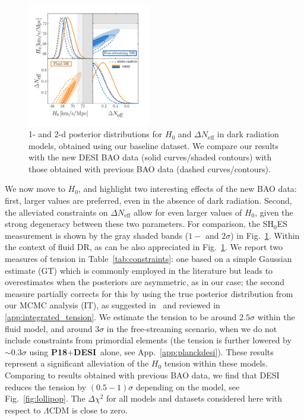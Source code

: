 \documentclass[aps,prd,twocolumn,notitlepage,
superscriptaddress,
nofootinbib,floatfix]{revtex4-2}
\newcommand{\planck}{\textbf{P18}}
\newcommand{\desi}{$\mathbf{+}$\textbf{DESI}}
\newcommand{\DNeff}{\Delta N_\text{eff}}
\begin{document}
\begin{figure}
    \includegraphics[width=0.48\textwidth]{figures_21_4/main_constraints.pdf}
    \caption{1- and 2-d posterior distributions for $H_0$ and $\DNeff$ in dark radiation models, obtained using our baseline dataset. We compare our results with the new DESI BAO data (solid curves/shaded contours) with those obtained with previous BAO data (dashed curves/contours).}
    \label{fig:bossvdesi}
\end{figure}

We now move to $H_0$, and highlight two interesting effects of the new BAO data: first, larger values are preferred, even in the absence of dark radiation. Second, the alleviated constraints on $\Delta N_\text{eff}$ allow for even larger values of $H_0$, given the strong degeneracy between these two parameters. For comparison, the SH$_0$ES measurement is shown by the gray shaded bands ($1-$ and $2\sigma$) in Fig.~\ref{fig:bossvdesi}. Within the context of fluid DR, as can be also appreciated in Fig.~\ref{fig:bossvdesi}. We report two measures of tension in Table~\ref{tab:constraints}: one based on a simple Gaussian estimate (GT) which is commonly employed in the literature but leads to overestimates when the posteriors are asymmetric, as in our case; the second measure partially corrects for this by using the true posterior distribution from our MCMC analysis (IT), as suggested in~\cite{Raveri:2021wfz} and reviewed in \cref{app:integrated_tension}. We estimate the tension to be around $2.5\sigma$ within the fluid model, and around $3\sigma$ in the free-streaming scenario, when we do not include constraints from primordial elements (the tension is further lowered by $\sim 0.3\sigma$ using \planck\desi~alone, see App.~\ref{app:planckdesi}). These results represent a significant alleviation of the $H_0$ tension within these models. Comparing to results obtained with previous BAO data, we find that DESI reduces the tension by $(0.5-1)\sigma$ depending on the model, see Fig.~\ref{fig:lollipop}. The $\Delta\chi^2$ for all models and datasets considered here with respect to $\Lambda$CDM is close to zero.
\end{document}
